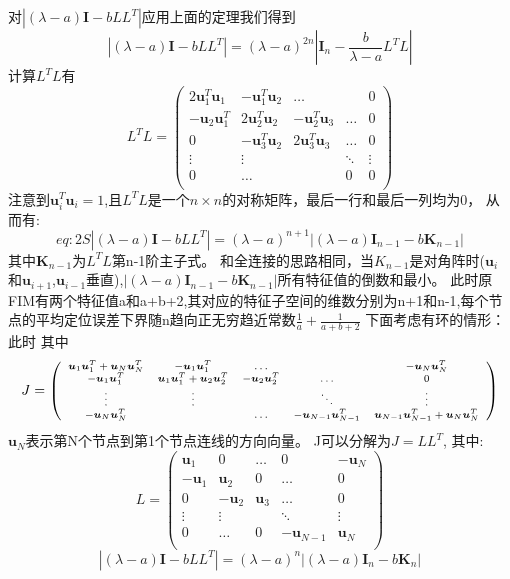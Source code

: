 \documentclass[12pt]{article}
\theoremstyle{remark}
\begin{document}
对$|(\lambda-a)\bm{I}-bLL^T|$应用上面的定理我们得到
\begin{equation}
|(\lambda-a)\bm{I}-bLL^T|=(\lambda-a)^{2n}|\bm{I}_n-\frac{b}{\lambda-a}L^TL|
\end{equation}
计算$L^TL$有
\[
L^TL=\left(
\begin{array}{ccccc}
2\bm{u}^T_1\bm{u}_1&-\bm{u}_1^T\bm{u}_2&\dots&&0\\
-\bm{u}_2\bm{u}_1^T&2\bm{u}_2^T\bm{u}_2&-\bm{u}_2^T\bm{u}_3&\dots&0\\
0&-\bm{u}_3^T\bm{u}_2&2\bm{u}_3^T\bm{u}_3&\dots&0\\
\vdots &\vdots&&\ddots &\vdots\\
0&\dots&&0&0\\
\end{array}
\right)
\]
注意到$\bm{u}_i^T\bm{u}_i=1$,且$L^TL$是一个$n \times n$的对称矩阵，最后一行和最后一列均为0，
从而有:
\begin{equation}{eq:2S}
|(\lambda-a)\bm{I}-bLL^T|=(\lambda-a)^{n+1}|(\lambda-a)\bm{I}_{n-1}-b\bm{K}_{n-1}|
\end{equation}
其中$\bm{K}_{n-1}$为$L^TL$第n-1阶主子式。
和全连接的思路相同，当$K_{n-1}$是对角阵时($\bm{u}_i$和$\bm{u}_{i+1}$,$\bm{u}_{i-1}$垂直),$|(\lambda-a)\bm{I}_{n-1}-b\bm{K}_{n-1}|$所有特征值的倒数和最小。
此时原FIM有两个特征值a和a+b+2,其对应的特征子空间的维数分别为n+1和n-1,每个节点的平均定位误差下界随n趋向正无穷趋近常数$\frac{1}{a}+\frac{1}{a+b+2}$
下面考虑有环的情形：
此时
其中\[
\scriptsize{
J=\left(
\begin{array}{ccccc}
\bm{u}_1\bm{u}_1^T+\bm{u}_{N}\bm{u}_{N}^T&-\bm{u}_1\bm{u}_1^T&\dots&&-\bm{u}_{N}\bm{u}_{N}^T\\
-\bm{u}_1\bm{u}_1^T&\bm{u}_1\bm{u}_1^T+\bm{u}_2\bm{u}_2^T&-\bm{u}_2\bm{u}_2^T&\dots&0\\
\vdots &\vdots&&\ddots &\vdots\\
-\bm{u}_N\bm{u}_N^T&&\dots&-\bm{u}_{N-1}\bm{u}_{N-1}^T&\bm{u}_{N-1}\bm{u}_{N-1}^T+\bm{u}_N\bm{u}_N^T\\
\end{array}
\right)}
\]
$\bm{u}_N$表示第N个节点到第1个节点连线的方向向量。
J可以分解为$J=LL^T$,
其中:
\[
L=\left(
\begin{array}{ccccc}
\bm{u}_1&0&\dots&0&-\bm{u}_{N}\\
-\bm{u}_1&\bm{u}_2&0&\dots&0\\
0&-\bm{u}_2&\bm{u}_3&\dots&0\\
\vdots &\vdots&&\ddots &\vdots\\
0&\dots&0&-\bm{u}_{N-1}&\bm{u}_N\\
\end{array}
\right)
\]
\begin{equation}
|(\lambda-a)\bm{I}-bLL^T|=(\lambda-a)^{n}|(\lambda-a)\bm{I}_n-b\bm{K}_n|
\end{equation}
\end{document}
